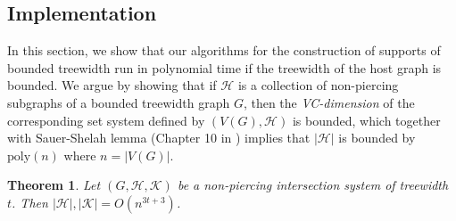 \documentclass[12pt]{article}
\newcommand{\HH}{\mathcal{H}}
\newcommand{\KK}{\mathcal{K}}
\newcommand{\poly}{\textrm{poly}}
\newtheorem{theorem}{Theorem}
\theoremstyle{case}
\begin{document}
\subsection{Implementation}
\label{sec:implementation}

In this section, we show that our algorithms for the construction of supports of bounded treewidth run in polynomial time if the treewidth of the host graph is bounded.
We argue by showing that if $\HH$ is a collection of non-piercing subgraphs of a bounded treewidth graph $G$, then the \emph{VC-dimension} of the corresponding set system defined by $(V(G),\HH)$ is bounded, which together with Sauer-Shelah lemma (Chapter 10 in \cite{Mat02LecDiscGeom}) implies that  $|\HH|$ is bounded by $\poly(n)$ where $n=|V(G)|$.

\begin{theorem}
\label{thm:vc-dimtw}
Let $(G,\HH,\KK)$ be a non-piercing intersection system of treewidth $t$.
Then $|\HH|,|\KK|=O(n^{3t+3})$.
\end{theorem}
\end{document}
